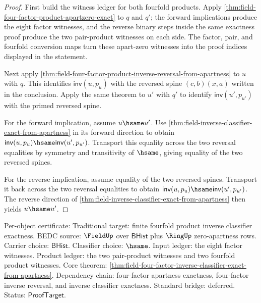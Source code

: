 \begin{proof}
First build the witness ledger for both fourfold products. Apply
\autoref{thm:field-four-factor-product-apartzero-exact} to $q$ and $q'$; the
forward implications produce the eight factor witnesses, and the reverse
binary steps inside the same exactness proof produce the two pair-product
witnesses on each side. The factor, pair, and fourfold conversion maps turn
these apart-zero witnesses into the proof indices displayed in the statement.

Next apply
\autoref{thm:field-four-factor-product-inverse-reversal-from-apartness} to
$u$ with $q$. This identifies $\mathsf{inv}(u,p_u)$ with the reversed spine
$(c,b)(x,a)$ written in the conclusion. Apply the same theorem to $u'$ with
$q'$ to identify $\mathsf{inv}(u',p_{u'})$ with the primed reversed spine.

For the forward implication, assume $u\hsame u'$. Use
\autoref{thm:field-inverse-classifier-exact-from-apartness} in its forward
direction to obtain $\mathsf{inv}(u,p_u)\hsame\mathsf{inv}(u',p_{u'})$.
Transport this equality across the two reversal equalities by symmetry and
transitivity of $\hsame$, giving equality of the two reversed spines.

For the reverse implication, assume equality of the two reversed spines.
Transport it back across the two reversal equalities to obtain
$\mathsf{inv}(u,p_u)\hsame\mathsf{inv}(u',p_{u'})$. The reverse direction of
\autoref{thm:field-inverse-classifier-exact-from-apartness} then yields
$u\hsame u'$.
\end{proof}

Per-object certificate: Traditional target: finite fourfold product inverse
classifier exactness. BEDC source: $\FieldUp$ over $\mathsf{BHist}$ plus
$\RingUp$ zero-apartness rows. Carrier choice: $\mathsf{BHist}$. Classifier
choice: $\hsame$. Input ledger: the eight factor witnesses. Product ledger:
the two pair-product witnesses and two fourfold product witnesses. Core
theorem: \autoref{thm:field-four-factor-inverse-classifier-exact-from-apartness}.
Dependency chain: four-factor apartness exactness, four-factor inverse
reversal, and inverse classifier exactness. Standard bridge: deferred. Status:
$\mathsf{ProofTarget}$.
